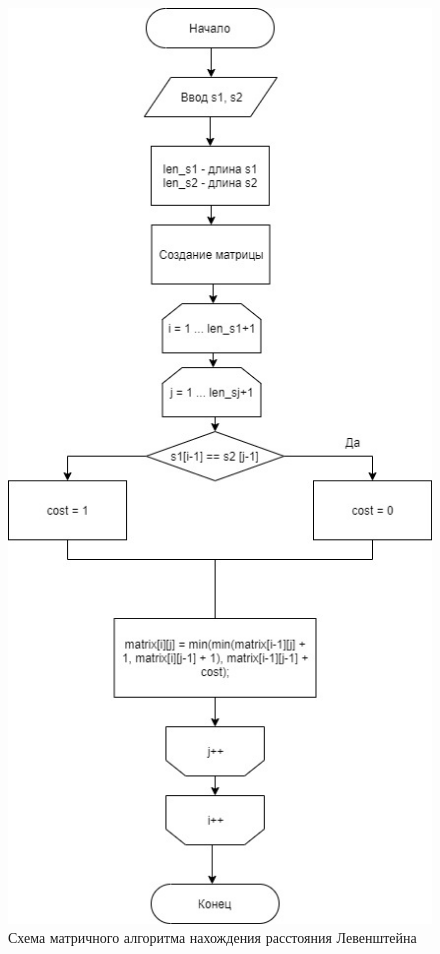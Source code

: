 \documentclass[12pt]{report}
\begin{document}
\begin{figure}[h]
\centering
\includegraphics[width=0.6\linewidth]{MatrixL.jpg}
\caption{Схема матричного алгоритма нахождения расстояния Левенштейна}
\label{fig:mpr}
\end{figure}
\end{document}

